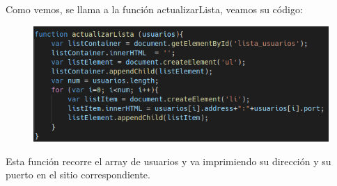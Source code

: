 \documentclass{article}
\begin{document}
	Como vemos, se llama a la función actualizarLista, veamos su código:
	\begin{figure}[H]
		\centering
		\includegraphics[totalheight=5.3cm]{img/6.png}
	\end{figure}
	Esta función recorre el array de usuarios y va imprimiendo su dirección y su puerto en el sitio correspondiente.
\end{document}
